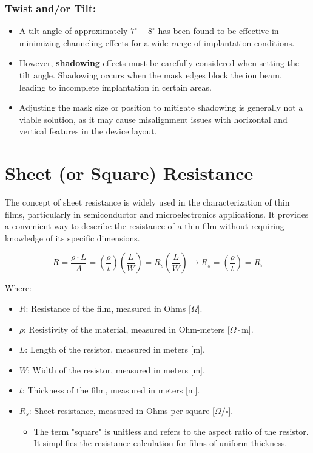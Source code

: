 \documentclass{report}
\begin{document}
\subsubsection{Twist and/or Tilt:}
\begin{itemize}
    \item A tilt angle of approximately $7^{\circ}-8^{\circ}$ has been found to be effective in minimizing channeling effects for a wide range of implantation conditions.
    \item However, \textbf{shadowing} effects must be carefully considered when setting the tilt angle. Shadowing occurs when the mask edges block the ion beam, leading to incomplete implantation in certain areas.
    \item Adjusting the mask size or position to mitigate shadowing is generally not a viable solution, as it may cause misalignment issues with horizontal and vertical features in the device layout.
\end{itemize}
\section{Sheet (or Square) Resistance}

The concept of sheet resistance is widely used in the characterization of thin films, particularly in semiconductor and microelectronics applications. It provides a convenient way to describe the resistance of a thin film without requiring knowledge of its specific dimensions.

$$R=\frac{\rho\cdot L}{A}=(\frac{\rho}{t})(\frac{L}{W})=R_{s}(\frac{L}{W}) \rightarrow R_{s}=(\frac{\rho}{t})=R_{\square}$$

Where:
\begin{itemize}
    \item $R$: Resistance of the film, measured in Ohms [$\Omega$].
    \item $\rho$: Resistivity of the material, measured in Ohm-meters [$\Omega \cdot \text{m}$].
    \item $L$: Length of the resistor, measured in meters [m].
    \item $W$: Width of the resistor, measured in meters [m].
    \item $t$: Thickness of the film, measured in meters [m].
    \item $R_{s}$: Sheet resistance, measured in Ohms per square [$\Omega/\square$].
    \begin{itemize}
        \item The term "square" is unitless and refers to the aspect ratio of the resistor. It simplifies the resistance calculation for films of uniform thickness.
    \end{itemize}
\end{itemize}
\end{document}
